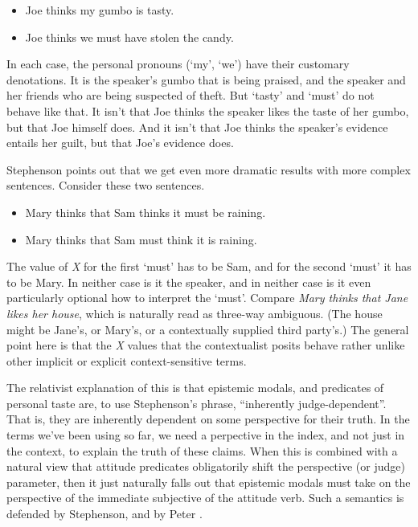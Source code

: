 \begin{itemize}
\item Joe thinks my gumbo is tasty.

\item Joe thinks we must have stolen the candy.

\end{itemize}
In each case, the personal pronouns (`my', `we') have their customary denotations. It is the speaker's gumbo that is being praised, and the speaker and her friends who are being suspected of theft. But `tasty' and `must' do not behave like that. It isn't that Joe thinks the speaker likes the taste of her gumbo, but that Joe himself does. And it isn't that Joe thinks the speaker's evidence entails her guilt, but that Joe's evidence does.

Stephenson points out that we get even more dramatic results with more complex sentences. Consider these two sentences.

\begin{itemize}
\item Mary thinks that Sam thinks it must be raining.

\item Mary thinks that Sam must think it is raining. ~\citep[490]{Stephenson2007}

\end{itemize}
The value of \emph{X} for the first `must' has to be Sam, and for the second `must' it has to be Mary. In neither case is it the speaker, and in neither case is it even particularly optional how to interpret the `must'. Compare \emph{Mary thinks that Jane likes her house}, which is naturally read as three-way ambiguous. (The house might be Jane's, or Mary's, or a contextually supplied third party's.) The general point here is that the \emph{X} values that the contextualist posits behave rather unlike other implicit or explicit context-sensitive terms.

The relativist explanation of this is that epistemic modals, and predicates of personal taste are, to use Stephenson's phrase, ``inherently judge-dependent''. That is, they are inherently dependent on some perspective for their truth. In the terms we've been using so far, we need a perpective in the index, and not just in the context, to explain the truth of these claims. When this is combined with a natural view that attitude predicates obligatorily shift the perspective (or judge) parameter, then it just naturally falls out that epistemic modals must take on the perspective of the immediate subjective of the attitude verb. Such a semantics is defended by Stephenson, and by Peter  \citet{Lasersohn2005}.

